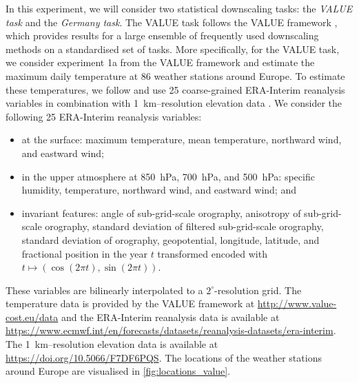 \documentclass[12pt, twoside]{report}
\begin{document}
In this experiment, we will consider two statistical downscaling tasks:
the \emph{VALUE task} and the \emph{Germany task}.
The VALUE task follows the VALUE framework \parencite{Maraun:2015:VALUE_A_Framework_to_Validate}, which provides results for a large ensemble of frequently used downscaling methods on a standardised set of tasks.
More specifically, for the VALUE task, we consider experiment 1a from the VALUE framework
and estimate the maximum daily temperature at 86 weather stations around Europe.
To estimate these temperatures, we follow \textcite{Vaughan:2022:Convolutional_Conditional_Neural_Processes_for} and use 25 coarse-grained ERA-Interim reanalysis variables \parencite{Dee:2011:The_ERA-Interim_Reanalysis_Configuration_and} in combination with \SI{1}{km}--resolution elevation data \parencite{EROSC:1997:GPTOTO30}.
We consider the following 25 ERA-Interim reanalysis variables:
\begin{itemize}
    \item at the surface: maximum temperature, mean temperature, northward wind, and eastward wind;
    \item in the upper atmosphere at \SI{850}{hPa}, \SI{700}{hPa}, and \SI{500}{hPa}: specific humidity, temperature, northward wind, and eastward wind; and
    \item
        invariant features:
        angle of sub-grid-scale orography,
        anisotropy of sub-grid-scale orography,
        standard deviation of filtered sub-grid-scale orography,
        standard deviation of orography,
        geopotential,
        longitude,
        latitude, and
        fractional position in the year $t$ transformed encoded with $t \mapsto (\cos(2\pi t), \sin(2 \pi t))$.
\end{itemize}
These variables are bilinearly interpolated to a $2^\circ$-resolution grid.
The temperature data is provided by the VALUE framework at \url{http://www.value-cost.eu/data} and the ERA-Interim reanalysis data is available at \url{https://www.ecmwf.int/en/forecasts/datasets/reanalysis-datasets/era-interim}.
The \SI{1}{km}--resolution elevation data is available at
\url{https://doi.org/10.5066/F7DF6PQS}.
The locations of the weather stations around Europe are visualised in \cref{fig:locations_value}.
\end{document}
